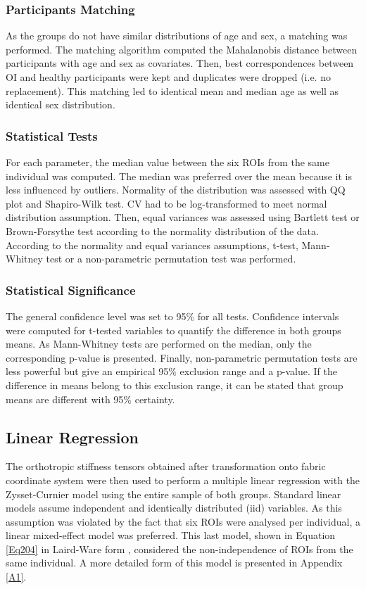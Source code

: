 \documentclass[a4paper,fleqn]{DC_ArtStyle}
\begin{document}
	\subsubsection{Participants Matching}
	As the groups do not have similar distributions of age and sex, a matching was performed. The matching algorithm computed the Mahalanobis distance between participants with age and sex as covariates. Then, best correspondences between OI and healthy participants were kept and duplicates were dropped (i.e. no replacement)\cite{Stuart2010}. This matching led to identical mean and median age as well as identical sex distribution.
	
	\subsubsection{Statistical Tests}
	For each parameter, the median value between the six ROIs from the same individual was computed. The median was preferred over the mean because it is less influenced by outliers. Normality of the distribution was assessed with QQ plot and Shapiro-Wilk test. CV had to be log-transformed to meet normal distribution assumption. Then, equal variances was assessed using Bartlett test or Brown-Forsythe test according to the normality distribution of the data. According to the normality and equal variances assumptions, t-test, Mann-Whitney test or a non-parametric permutation test was performed. 
	
	\subsubsection{Statistical Significance}
	The general confidence level was set to 95\% for all tests. Confidence intervals were computed for t-tested variables to quantify the difference in both groups means. As Mann-Whitney tests are performed on the median, only the corresponding p-value is presented. Finally, non-parametric permutation tests are less powerful but give an empirical 95\% exclusion range and a p-value. If the difference in means belong to this exclusion range, it can be stated that group means are different with 95\% certainty.
	
	\subsection{Linear Regression}
	The orthotropic stiffness tensors obtained after transformation onto fabric coordinate system were then used to perform a multiple linear regression with the Zysset-Curnier model using the entire sample of both groups. Standard linear models assume independent and identically distributed (iid) variables. As this assumption was violated by the fact that six ROIs were analysed per individual, a linear mixed-effect model was preferred. This last model, shown in Equation \ref{Eq204} in Laird-Ware form \cite{Laird1982}, considered the non-independence of ROIs from the same individual. A more detailed form of this model is presented in Appendix \ref{A1}.
	
\end{document}
